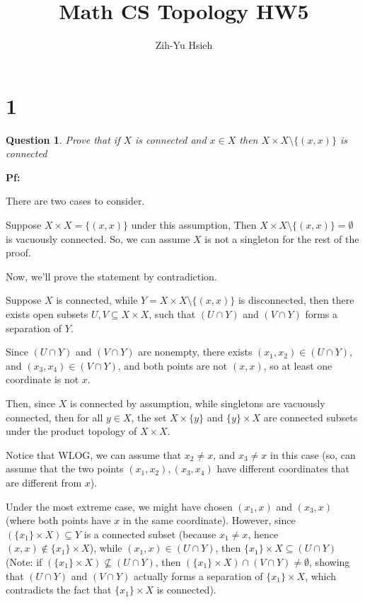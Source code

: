 \documentclass{article}
\title{Math CS Topology HW5}
\author{Zih-Yu Hsieh}
\newtheorem{question}{Question}
\begin{document}
\maketitle

\section*{1}
\begin{myBox}[]{}
    \begin{question}
        Prove that if $X$ is connected and $x\in X$ then $X\times X\setminus \{(x,x)\}$ is connected
    \end{question}
\end{myBox}

\textbf{Pf:}

There are two cases to consider.

Suppose $X\times X=\{(x,x)\}$ under this assumption, Then $X\times X\setminus\{(x,x)\} = \emptyset$ is vacuously connected.
So, we can assume $X$ is not a singleton for the rest of the proof.

\hfil

Now, we'll prove the statement by contradiction. 

Suppose $X$ is connected, while $Y=X\times X\setminus\{(x,x)\}$ is disconnected,
then there exists open subsets $U,V\subseteq X\times X$, such that $(U\cap Y)$ and $(V\cap Y)$ forms a separation of $Y$.

Since $(U\cap Y)$ and $(V\cap Y)$ are nonempty, there exists $(x_1,x_2)\in (U\cap Y)$, and $(x_3,x_4)\in (V\cap Y)$, and both points are not $(x,x)$, so at least one coordinate is not $x$.

Then, since $X$ is connected by assumption, while singletons are vacuously connected, then for all $y\in X$, the set $X\times \{y\}$ and $\{y\}\times X$ are connected subsets under the product topology of $X\times X$.

\hfil

Notice that WLOG, we can assume that $x_2\neq x$, and $x_3\neq x$ in this case (so, can assume that the two points $(x_1,x_2),(x_3,x_4)$ have different coordinates that are different from $x$).

Under the most extreme case, we might have chosen $(x_1,x)$ and $(x_3,x)$ (where both points have $x$ in the same coordinate). However, since $(\{x_1\}\times X)\subseteq Y$ is a connected subset (because $x_1\neq x$, hence $(x,x)\notin \{x_1\}\times X$), while $(x_1,x)\in (U\cap Y)$,
then $\{x_1\}\times X\subseteq (U\cap Y)$ (Note: if $(\{x_1\}\times X)\not\subseteq (U\cap Y)$, then $(\{x_1\}\times X)\cap (V\cap Y)\neq \emptyset$, showing that $(U\cap Y)$ and $(V\cap Y)$ actually forms a separation of $\{x_1\}\times X$,
which contradicts the fact that $\{x_1\}\times X$ is connected).
\end{document}
